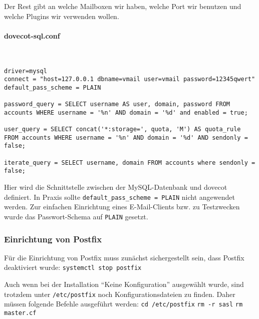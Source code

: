 Der Rest gibt an welche Mailboxen wir haben, welche Port wir benutzen und welche Plugins wir verwenden wollen.

\paragraph{dovecot-sql.conf}\mbox{}\\
\begin{lstlisting}[caption=dovecot-sql.conf]
driver=mysql
connect = "host=127.0.0.1 dbname=vmail user=vmail password=12345qwert"
default_pass_scheme = PLAIN

password_query = SELECT username AS user, domain, password FROM accounts WHERE username = '%n' AND domain = '%d' and enabled = true;

user_query = SELECT concat('*:storage=', quota, 'M') AS quota_rule FROM accounts WHERE username = '%n' AND domain = '%d' AND sendonly = false;

iterate_query = SELECT username, domain FROM accounts where sendonly = false;
\end{lstlisting}

Hier wird die Schnittstelle zwischen der MySQL-Datenbank und dovecot definiert. In Praxis sollte \verb|default_pass_scheme = PLAIN| nicht angewendet werden. Zur einfachen Einrichtung eines E-Mail-Clients bzw. zu Testzwecken wurde das Passwort-Schema auf \verb|PLAIN| gesetzt. 

\subsubsection{Einrichtung von Postfix}
Für die Einrichtung von Postfix muss zunächst sichergestellt sein, dass Postfix deaktiviert wurde:
\verb|systemctl stop postfix|\newline

Auch wenn bei der Installation ``Keine Konfiguration'' ausgewählt wurde, sind trotzdem unter \verb|/etc/postfix| noch Konfigurationsdateien zu finden. Daher müssen folgende Befehle ausgeführt werden:\newline
\verb|cd /etc/postfix|\newline
\verb|rm -r sasl|\newline
\verb|rm master.cf|\newline

